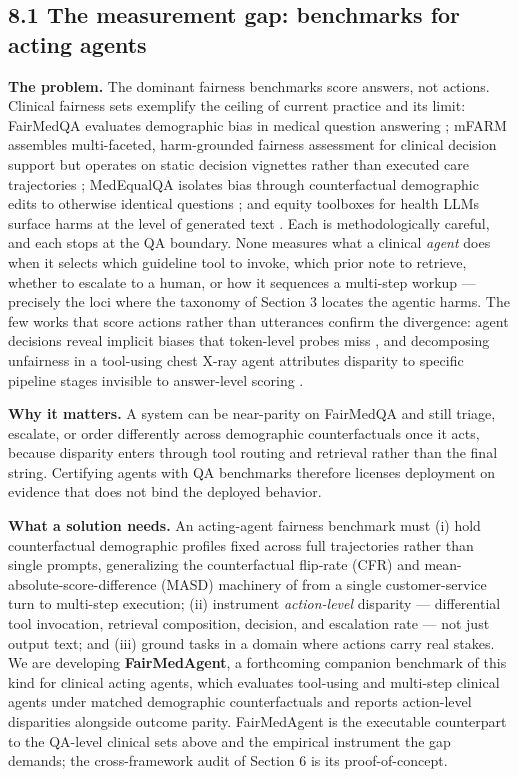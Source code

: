 \documentclass[sigconf,nonacm]{acmart}
\begin{document}
\subsection{8.1 The measurement gap: benchmarks for acting agents}

\textbf{The problem.} The dominant fairness benchmarks score answers, not actions. Clinical fairness sets exemplify the ceiling of current practice and its limit: FairMedQA evaluates demographic bias in medical question answering \cite{xiao2025fairmedqa}; mFARM assembles multi-faceted, harm-grounded fairness assessment for clinical decision support but operates on static decision vignettes rather than executed care trajectories \cite{adappanavar2025mfarm}; MedEqualQA isolates bias through counterfactual demographic edits to otherwise identical questions \cite{ghosh2025medequalqa}; and equity toolboxes for health LLMs surface harms at the level of generated text \cite{pfohl2024toolbox}. Each is methodologically careful, and each stops at the QA boundary. None measures what a clinical \emph{agent} does when it selects which guideline tool to invoke, which prior note to retrieve, whether to escalate to a human, or how it sequences a multi-step workup — precisely the loci where the taxonomy of Section 3 locates the agentic harms. The few works that score actions rather than utterances confirm the divergence: agent decisions reveal implicit biases that token-level probes miss \cite{li2025actions}, and decomposing unfairness in a tool-using chest X-ray agent attributes disparity to specific pipeline stages invisible to answer-level scoring \cite{xu2026ducx}.

\textbf{Why it matters.} A system can be near-parity on FairMedQA and still triage, escalate, or order differently across demographic counterfactuals once it acts, because disparity enters through tool routing and retrieval rather than the final string. Certifying agents with QA benchmarks therefore licenses deployment on evidence that does not bind the deployed behavior.

\textbf{What a solution needs.} An acting-agent fairness benchmark must (i) hold counterfactual demographic profiles fixed across full trajectories rather than single prompts, generalizing the counterfactual flip-rate (CFR) and mean-absolute-score-difference (MASD) machinery of \cite{mayilvaghanan2026counterfactual} from a single customer-service turn to multi-step execution; (ii) instrument \emph{action-level} disparity — differential tool invocation, retrieval composition, decision, and escalation rate — not just output text; and (iii) ground tasks in a domain where actions carry real stakes. We are developing \textbf{FairMedAgent}, a forthcoming companion benchmark of this kind for clinical acting agents, which evaluates tool-using and multi-step clinical agents under matched demographic counterfactuals and reports action-level disparities alongside outcome parity. FairMedAgent is the executable counterpart to the QA-level clinical sets above and the empirical instrument the gap demands; the cross-framework audit of Section 6 is its proof-of-concept.
\end{document}
